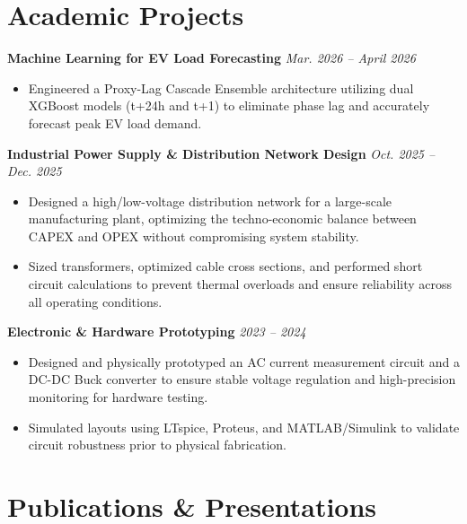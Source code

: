 \documentclass[11pt,letterpaper]{article}
\begin{document}
\vspace{1ex}

\section*{Academic Projects}

\noindent\textbf{Machine Learning for EV Load Forecasting} \hfill \textit{Mar. 2026 -- April 2026}
\begin{itemize}[leftmargin=0.25in, itemsep=0pt, topsep=0pt]
    \item Engineered a Proxy-Lag Cascade Ensemble architecture utilizing dual XGBoost models (t+24h and t+1) to eliminate phase lag and accurately forecast peak EV load demand.
\end{itemize}

\vspace{1ex}
\noindent\textbf{Industrial Power Supply \& Distribution Network Design} \hfill \textit{Oct. 2025 -- Dec. 2025}
\begin{itemize}[leftmargin=0.25in, itemsep=0pt, topsep=0pt]
    \item Designed a high/low-voltage distribution network for a large-scale manufacturing plant, optimizing the techno-economic balance between CAPEX and OPEX without compromising system stability.
    \item Sized transformers, optimized cable cross sections, and performed short circuit calculations to prevent thermal overloads and ensure reliability across all operating conditions.
\end{itemize}

\vspace{1ex}
\noindent\textbf{Electronic \& Hardware Prototyping} \hfill \textit{2023 -- 2024}
\begin{itemize}[leftmargin=0.25in, itemsep=0pt, topsep=0pt]
    \item Designed and physically prototyped an AC current measurement circuit and a DC-DC Buck converter to ensure stable voltage regulation and high-precision monitoring for hardware testing.
    \item Simulated layouts using LTspice, Proteus, and MATLAB/Simulink to validate circuit robustness prior to physical fabrication.
\end{itemize}

\vspace{1ex}

\section*{Publications \& Presentations}
\end{document}
